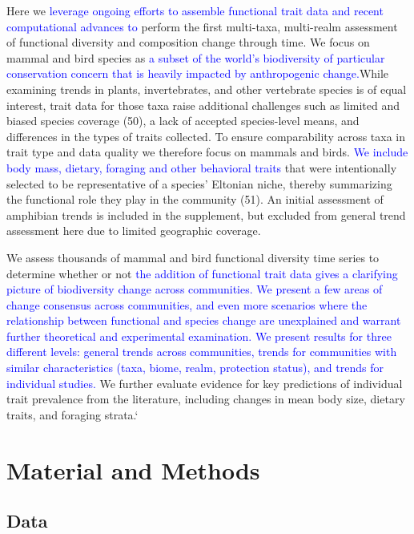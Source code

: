\documentclass{article}
\begin{document}
Here we
\textcolor{blue}{leverage ongoing efforts to assemble functional trait data and recent computational advances to}
perform the first multi-taxa, multi-realm assessment of functional
diversity and composition change through time. We focus on mammal and
bird species as
\textcolor{blue}{a subset of the world's biodiversity of particular conservation concern that is heavily impacted by anthropogenic change.}While
examining trends in plants, invertebrates, and other vertebrate species
is of equal interest, trait data for those taxa raise additional
challenges such as limited and biased species coverage (50), a lack of
accepted species-level means, and differences in the types of traits
collected. To ensure comparability across taxa in trait type and data
quality we therefore focus on mammals and birds.
\textcolor{blue}{We include body mass, dietary, foraging and other behavioral traits}
that were intentionally selected to be representative of a species'
Eltonian niche, thereby summarizing the functional role they play in the
community (51). An initial assessment of amphibian trends is included in
the supplement, but excluded from general trend assessment here due to
limited geographic coverage.

We assess thousands of mammal and bird functional diversity time series
to determine whether or not
\textcolor{blue}{the addition of functional trait data gives a clarifying picture of biodiversity change across communities. We present a few areas of change consensus across communities, and even more scenarios where the relationship between functional and species change are unexplained and warrant further theoretical and experimental examination. We present results for three different levels: general trends across communities, trends for communities with similar characteristics (taxa, biome, realm, protection status), and trends for individual studies.}
We further evaluate evidence for key predictions of individual trait
prevalence from the literature, including changes in mean body size,
dietary traits, and foraging strata.`

\hypertarget{material-and-methods}{%
\section{Material and Methods}\label{material-and-methods}}

\hypertarget{data}{%
\subsection{Data}\label{data}}
\end{document}
